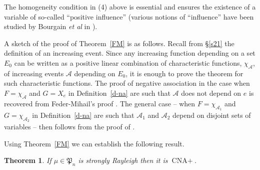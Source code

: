 \documentclass[10pt,reqno]{amsart}
\theoremstyle{plain}
\newtheorem{theorem}{Theorem}[section]
\theoremstyle{definition}
\theoremstyle{remark}
\newcommand{\cA}{\mathcal{A}}
\newcommand{\CNA}{\text{CNA}}
\newcommand{\NA}{\text{NA}}
\newcommand{\fP}{\mathfrak{P}}
\begin{document}
The homogeneity condition in (4) above is essential and ensures 
the existence of
a variable of so-called ``positive influence'' \cite{DJR} (various 
notions of ``influence'' have been studied by Bourgain {\em et al} in 
\cite{BKKKL}). 

A sketch of the proof of Theorem~\ref{FM} is as follows.  
Recall from \S \ref{s21} the definition of an increasing event. Since any 
increasing function depending on a set $E_0$ can be written as a positive 
linear 
combination of characteristic functions, $\chi_{\mathcal{A}}$, of increasing 
events $\mathcal{A}$ depending on $E_0$, it is enough to prove the theorem for 
such characteristic functions. The proof of negative association in the case
when 
$F =\chi_{\mathcal{A}}$ and $G = X_e$ in Definition~\ref{d-na} are such that
$\cA$ does not depend on $e$ is recovered from Feder-Mihail's proof 
\cite{feder,Lyons-Peres}. The general case -- when
$F =\chi_{\mathcal{A}_1}$ and $G = \chi_{\mathcal{A}_2}$ in 
Definition~\ref{d-na} are such that $\cA_1$ and $\cA_2$ depend on disjoint
sets of variables -- then follows from the proof of \cite[Theorem 6.5]{Lyons}. 

Using Theorem~\ref{FM} we can establish the following result.

\begin{theorem}\label{stab-NA}
If $\mu\in \fP_n$ is strongly Rayleigh then it is $\CNA+$. 
\end{theorem}
\end{document}
